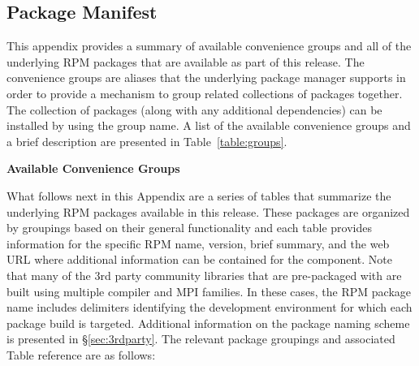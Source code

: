 
\newcommand{\captionSpace}{-0.15cm}
\newcommand{\tabSpaceBot}{1.0cm}
\captionsetup{justification=raggedright,singlelinecheck=false}


\subsection{Package Manifest} \label {appendix:manifest}

\vspace*{0.25cm}
This appendix provides a summary of available convenience groups and all of the
underlying RPM packages that are available as part of this \FSP{} release. The
convenience groups are aliases that the underlying package manager supports in
order to provide a mechanism to group related collections of packages
together. The collection of packages (along with any additional dependencies)
can be installed by using the group name. A list of the available convenience
groups and a brief description are presented in Table~\ref{table:groups}.

\vspace*{1.25cm}
\begin{table}[h] 
\caption{\bf Available \FSP{} Convenience Groups} \vspace*{\captionSpace{}}
\label{table:groups}

\end{table}

\newpage
What follows next in this Appendix are a series of tables that summarize the
underlying RPM packages available in this \FSP{} release. These packages are
organized by groupings based on their general functionality and each table
provides information for the specific RPM name, version, brief summary, and the
web URL where additional information can be contained for the component. Note
that many of the 3rd party community libraries that are pre-packaged
with \FSP{} are built using multiple compiler and MPI families. In these cases,
the RPM package name includes delimiters identifying the development
environment for which each package build is targeted.  Additional information
on the \FSP{} package naming scheme is presented in \S\ref{sec:3rdparty}. 
The relevant package groupings and associated Table reference are as follows:

